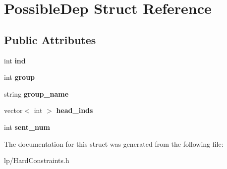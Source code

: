 \hypertarget{struct_possible_dep}{
\section{PossibleDep Struct Reference}
\label{struct_possible_dep}
}
\subsection*{Public Attributes}
\begin{DoxyCompactItemize}
\item 
\hypertarget{struct_possible_dep_a2f693c6bb47703c1a989f8971e06d561}{
int {\bfseries ind}}
\label{struct_possible_dep_a2f693c6bb47703c1a989f8971e06d561}

\item 
\hypertarget{struct_possible_dep_ad2c0887a242af14d7bdd6bc7a3528bf3}{
int {\bfseries group}}
\label{struct_possible_dep_ad2c0887a242af14d7bdd6bc7a3528bf3}

\item 
\hypertarget{struct_possible_dep_a2f685f514a785a8365c9a1682fce4d5a}{
string {\bfseries group\_\-name}}
\label{struct_possible_dep_a2f685f514a785a8365c9a1682fce4d5a}

\item 
\hypertarget{struct_possible_dep_a4b4536449d9c17e05b7f5454b0d922f7}{
vector$<$ int $>$ {\bfseries head\_\-inds}}
\label{struct_possible_dep_a4b4536449d9c17e05b7f5454b0d922f7}

\item 
\hypertarget{struct_possible_dep_acec0859157184e3f1fe962236fe6303b}{
int {\bfseries sent\_\-num}}
\label{struct_possible_dep_acec0859157184e3f1fe962236fe6303b}

\end{DoxyCompactItemize}


The documentation for this struct was generated from the following file:\begin{DoxyCompactItemize}
\item 
lp/HardConstraints.h\end{DoxyCompactItemize}
